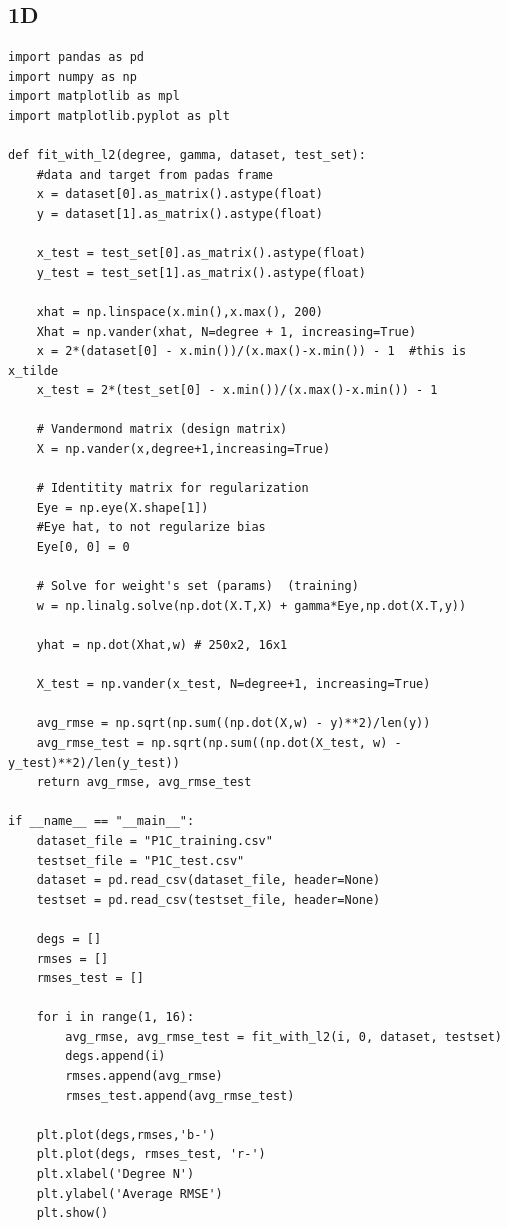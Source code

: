 \documentclass[12pt]{article}
\begin{document}
\begin{flushleft}
		\subsection*{1D}
\begin{lstlisting}
import pandas as pd
import numpy as np
import matplotlib as mpl
import matplotlib.pyplot as plt

def fit_with_l2(degree, gamma, dataset, test_set):
	#data and target from padas frame
	x = dataset[0].as_matrix().astype(float)
	y = dataset[1].as_matrix().astype(float)
	
	x_test = test_set[0].as_matrix().astype(float)
	y_test = test_set[1].as_matrix().astype(float)
	
	xhat = np.linspace(x.min(),x.max(), 200)
	Xhat = np.vander(xhat, N=degree + 1, increasing=True)
	x = 2*(dataset[0] - x.min())/(x.max()-x.min()) - 1  #this is x_tilde
	x_test = 2*(test_set[0] - x.min())/(x.max()-x.min()) - 1
	
	# Vandermond matrix (design matrix)
	X = np.vander(x,degree+1,increasing=True)
	
	# Identitity matrix for regularization
	Eye = np.eye(X.shape[1])
	#Eye hat, to not regularize bias
	Eye[0, 0] = 0
	
	# Solve for weight's set (params)  (training)
	w = np.linalg.solve(np.dot(X.T,X) + gamma*Eye,np.dot(X.T,y))
	
	yhat = np.dot(Xhat,w) # 250x2, 16x1
	
	X_test = np.vander(x_test, N=degree+1, increasing=True)
	
	avg_rmse = np.sqrt(np.sum((np.dot(X,w) - y)**2)/len(y))
	avg_rmse_test = np.sqrt(np.sum((np.dot(X_test, w) - y_test)**2)/len(y_test))
	return avg_rmse, avg_rmse_test

if __name__ == "__main__":
	dataset_file = "P1C_training.csv"
	testset_file = "P1C_test.csv"
	dataset = pd.read_csv(dataset_file, header=None)
	testset = pd.read_csv(testset_file, header=None)
	
	degs = []
	rmses = []
	rmses_test = []
	
	for i in range(1, 16):
		avg_rmse, avg_rmse_test = fit_with_l2(i, 0, dataset, testset)
		degs.append(i)
		rmses.append(avg_rmse)
		rmses_test.append(avg_rmse_test)
	
	plt.plot(degs,rmses,'b-')
	plt.plot(degs, rmses_test, 'r-')
	plt.xlabel('Degree N')
	plt.ylabel('Average RMSE')
	plt.show()


\end{lstlisting}
\end{flushleft}
\end{document}
